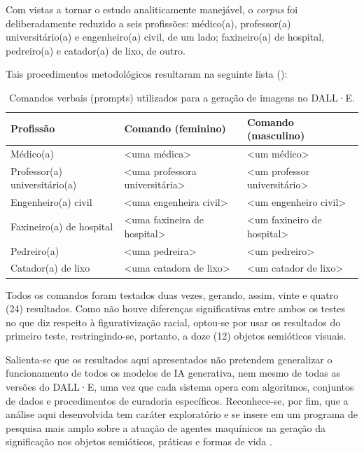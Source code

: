 \documentclass[portuguese]{textolivre}
\begin{document}
Com vistas a tornar o estudo analiticamente manejável, o \textit{corpus} foi deliberadamente reduzido a seis profissões: médico(a), professor(a) universitário(a) e engenheiro(a) civil, de um lado; faxineiro(a) de hospital, pedreiro(a) e catador(a) de lixo, de outro.

Tais procedimentos metodológicos resultaram na seguinte lista ():

\begin{table}[htbp]
  \centering
  \caption{Comandos verbais (prompts) utilizados para a geração de imagens no DALL·E.}
  \label{tab1}
  \begin{tabular}{lll}
    \toprule
    \small
    Profissão & Comando (feminino) & Comando (masculino) \\
    \midrule
    Médico(a) & <uma médica> & <um médico> \\
    Professor(a) universitário(a) & <uma professora universitária> & <um professor universitário> \\
    Engenheiro(a) civil & <uma engenheira civil> & <um engenheiro civil> \\
    Faxineiro(a) de hospital & <uma faxineira de hospital> & <um faxineiro de hospital> \\
    Pedreiro(a) & <uma pedreira> & <um pedreiro> \\
    Catador(a) de lixo & <uma catadora de lixo> & <um catador de lixo> \\
    \bottomrule
  \end{tabular}
\end{table}

Todos os comandos foram testados duas vezes, gerando, assim, vinte e quatro (24) resultados. Como não houve diferenças significativas entre ambos os testes no que diz respeito à figurativização racial, optou-se por usar os resultados do primeiro teste, restringindo-se, portanto, a doze (12) objetos semióticos visuais.

Salienta-se que os resultados aqui apresentados não pretendem generalizar o funcionamento de todos os modelos de IA generativa, nem mesmo de todas as versões do DALL·E, uma vez que cada sistema opera com algoritmos, conjuntos de dados e procedimentos de curadoria específicos. Reconhece-se, por fim, que a análise aqui desenvolvida tem caráter exploratório e se insere em um programa de pesquisa mais amplo sobre a atuação de agentes maquínicos na geração da significação nos objetos semióticos, práticas e formas de vida \cite{moraes2021nocao,moraes2024semiotica,moraes2025semioticista,moraesdesousa2026construction,moraesdesousa2026generative}.
\end{document}
